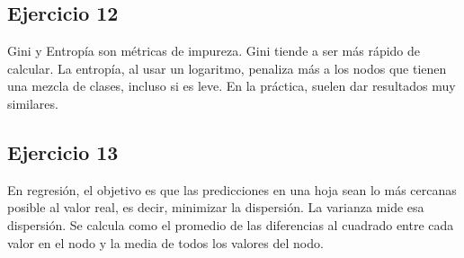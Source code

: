 \documentclass[12pt]{article}
\begin{document}
\subsection{Ejercicio 12}

Gini y Entropía son métricas de impureza. Gini tiende a ser más rápido de calcular. La entropía, al usar un logaritmo, penaliza más a los nodos que tienen una mezcla de clases, incluso si es leve. En la práctica, suelen dar resultados muy similares.

\subsection{Ejercicio 13}

En regresión, el objetivo es que las predicciones en una hoja sean lo más cercanas posible al valor real, es decir, minimizar la dispersión. La varianza mide esa dispersión. Se calcula como el promedio de las diferencias al cuadrado entre cada valor en el nodo y la media de todos los valores del nodo.
\end{document}
